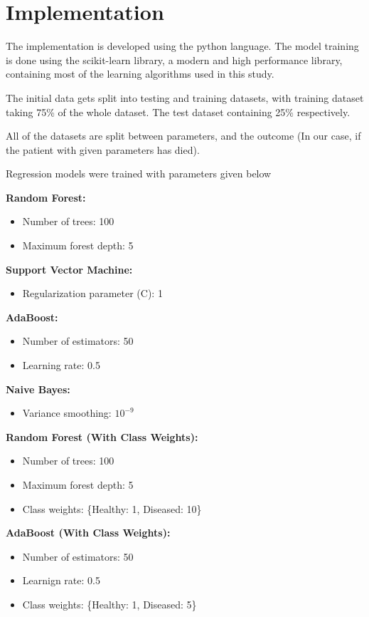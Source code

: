 \documentclass[conference]{IEEEtran}
\begin{document}
\section{Implementation}

The implementation is developed using the python language. The model training
is done using the scikit-learn library, a modern and high performance library, containing
most of the learning algorithms used in this study.

The initial data gets split into testing and training datasets, with training
dataset taking 75\% of the whole dataset. The test dataset containing 25\% respectively.

All of the datasets are split between parameters, and the outcome
(In our case, if the patient with given parameters has died).

Regression models were trained with parameters given below

\textbf{Random Forest:}
\begin{itemize}
    \item Number of trees: 100
    \item Maximum forest depth: 5
\end{itemize}

\textbf{Support Vector Machine:}
\begin{itemize}
    \item Regularization parameter (C): 1
\end{itemize}

\textbf{AdaBoost:}
\begin{itemize}
    \item Number of estimators: 50
    \item Learning rate: 0.5
\end{itemize}

\textbf{Naive Bayes:}
\begin{itemize}
    \item Variance smoothing: $10^{-9}$
\end{itemize}

\textbf{Random Forest (With Class Weights):}
\begin{itemize}
    \item Number of trees: 100
    \item Maximum forest depth: 5
    \item Class weights: \{Healthy: 1, Diseased: 10\}
\end{itemize}

\textbf{AdaBoost (With Class Weights):}
\begin{itemize}
    \item Number of estimators: 50
    \item Learnign rate: 0.5
    \item Class weights: \{Healthy: 1, Diseased: 5\}
\end{itemize}
\end{document}
